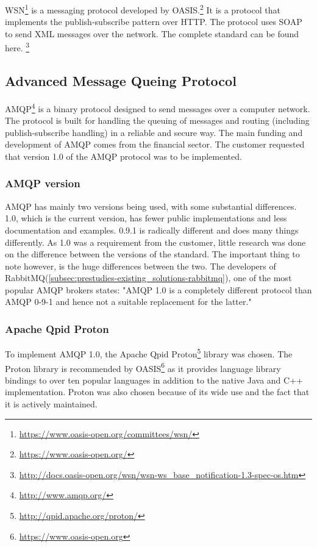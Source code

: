 WSN\footnote{\url{https://www.oasis-open.org/committees/wsn/}} is a messaging protocol developed by OASIS.\footnote{\url{https://www.oasis-open.org/}} It is a protocol that implements the publish-subscribe pattern over HTTP. The protocol uses SOAP to send XML messages over the network. The complete standard can be found here. \footnote{\url{http://docs.oasis-open.org/wsn/wsn-ws_base_notification-1.3-spec-os.htm}}

\subsection{Advanced Message Queing Protocol}
\label{subsec:prestudies-amqp}
AMQP\footnote{\url{http://www.amqp.org/}} is a binary protocol designed to send messages over a computer network. The protocol is built for handling the queuing of messages and routing (including publish-subscribe handling) in a reliable and secure way. The main funding and development of AMQP comes from the financial sector. The customer requested that version 1.0 of the AMQP protocol was to be implemented.

\subsubsection{AMQP version}
\label{subsec:prestudies-amqp-amqp_version}
AMQP has mainly two versions being used, with some substantial differences. 1.0, which is the current version, has fewer public implementations and less documentation and examples. 0.9.1 is radically different and does many things differently. As 1.0 was a requirement from the customer, little research was done on the difference between the versions of the standard. The important thing to note however, is the huge differences between the two. The developers of RabbitMQ(\ref{subsec:prestudies-existing_solutions-rabbitmq}), one of the most popular AMQP brokers states: "AMQP 1.0 is a completely different protocol than AMQP 0-9-1 and hence not a suitable replacement for the latter."

\subsubsection{Apache Qpid Proton}
To implement AMQP 1.0, the Apache Qpid Proton\footnote{\url{http://qpid.apache.org/proton/}} library was chosen. The Proton library is recommended by OASIS\footnote{\url{https://www.oasis-open.org}} as it provides language library bindings to over ten popular languages in addition to the native Java and C++ implementation. Proton was also chosen because of its wide use and the fact that it is actively maintained.

